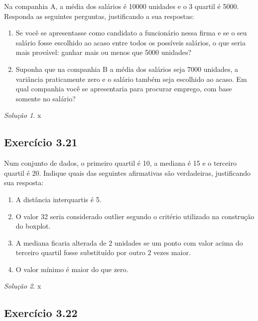 \documentclass[
]{latex/krantz}
\providecommand{\tightlist}{%
  \setlength{\itemsep}{0pt}\setlength{\parskip}{0pt}}
\theoremstyle{definition}
\theoremstyle{definition}
\theoremstyle{definition}
\theoremstyle{definition}
\theoremstyle{remark}
\newtheorem*{solution}{Solução}
\begin{document}
Na companhia A, a média dos salários é 10000 unidades e o 3 quartil é 5000. Responda as seguintes perguntas, justificando a sua respostas:

\begin{enumerate}
\def\labelenumi{\alph{enumi})}
\tightlist
\item
  Se você se apresentasse como candidato a funcionário nessa firma e se o seu salário fosse escolhido ao acaso entre todos os possíveis salários, o que seria mais provável: ganhar mais ou menos que 5000 unidades?
\item
  Suponha que na companhia B a média dos salários seja 7000 unidades, a variância praticamente zero e o salário também seja escolhido ao acaso. Em qual companhia você se apresentaria para procurar emprego, com base somente no salário?
\end{enumerate}

\begin{solution}
x
\end{solution}

\hypertarget{exr3-21}{%
\subsection*{Exercício 3.21}\label{exr3-21}}

Num conjunto de dados, o primeiro quartil é 10, a mediana é 15 e o terceiro quartil é 20. Indique quais das seguintes afirmativas são verdadeiras, justificando sua resposta:

\begin{enumerate}
\def\labelenumi{\alph{enumi})}
\tightlist
\item
  A distância interquartis é 5.
\item
  O valor 32 seria considerado outlier segundo o critério utilizado na construção do boxplot.
\item
  A mediana ficaria alterada de 2 unidades se um ponto com valor acima do terceiro quartil fosse substituído por outro 2 vezes maior.
\item
  O valor mínimo é maior do que zero.
\end{enumerate}

\begin{solution}
x
\end{solution}

\hypertarget{exr3-22}{%
\subsection*{Exercício 3.22}\label{exr3-22}}
\end{document}
